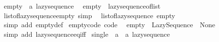 \begin{isabellebody}
\isanewline
%
\endisadelimproof
\isanewline
{}\isamarkupfalse%
\ empty\ {\isacharcolon}{\kern0pt}{\isacharcolon}{\kern0pt}\ {\isachardoublequoteopen}{\isacharprime}{\kern0pt}a\ lazy{\isacharunderscore}{\kern0pt}sequence{\isachardoublequoteclose}\isanewline
{}\isanewline
\ \ {\isachardoublequoteopen}empty\ {\isacharequal}{\kern0pt}\ lazy{\isacharunderscore}{\kern0pt}sequence{\isacharunderscore}{\kern0pt}of{\isacharunderscore}{\kern0pt}list\ {\isacharbrackleft}{\kern0pt}{\isacharbrackright}{\kern0pt}{\isachardoublequoteclose}\isanewline
\isanewline
{}\isamarkupfalse%
\ list{\isacharunderscore}{\kern0pt}of{\isacharunderscore}{\kern0pt}lazy{\isacharunderscore}{\kern0pt}sequence{\isacharunderscore}{\kern0pt}empty\ {\isacharbrackleft}{\kern0pt}simp{\isacharbrackright}{\kern0pt}{\isacharcolon}{\kern0pt}\isanewline
\ \ {\isachardoublequoteopen}list{\isacharunderscore}{\kern0pt}of{\isacharunderscore}{\kern0pt}lazy{\isacharunderscore}{\kern0pt}sequence\ empty\ {\isacharequal}{\kern0pt}\ {\isacharbrackleft}{\kern0pt}{\isacharbrackright}{\kern0pt}{\isachardoublequoteclose}\isanewline
%
\isadelimproof
\ \ %
\endisadelimproof
%
\isatagproof
{}\isamarkupfalse%
\ {\isacharparenleft}{\kern0pt}simp\ add{\isacharcolon}{\kern0pt}\ empty{\isacharunderscore}{\kern0pt}def{\isacharparenright}{\kern0pt}%
\endisatagproof
{\isafoldproof}%
%
\isadelimproof
\isanewline
%
\endisadelimproof
\isanewline
{}\isamarkupfalse%
\ empty{\isacharunderscore}{\kern0pt}code\ {\isacharbrackleft}{\kern0pt}code{\isacharbrackright}{\kern0pt}{\isacharcolon}{\kern0pt}\isanewline
\ \ {\isachardoublequoteopen}empty\ {\isacharequal}{\kern0pt}\ Lazy{\isacharunderscore}{\kern0pt}Sequence\ {\isacharparenleft}{\kern0pt}{\isasymlambda}{\isacharunderscore}{\kern0pt}{\isachardot}{\kern0pt}\ None{\isacharparenright}{\kern0pt}{\isachardoublequoteclose}\isanewline
%
\isadelimproof
\ \ %
\endisadelimproof
%
\isatagproof
{}\isamarkupfalse%
\ {\isacharparenleft}{\kern0pt}simp\ add{\isacharcolon}{\kern0pt}\ lazy{\isacharunderscore}{\kern0pt}sequence{\isacharunderscore}{\kern0pt}eq{\isacharunderscore}{\kern0pt}iff{\isacharparenright}{\kern0pt}%
\endisatagproof
{\isafoldproof}%
%
\isadelimproof
\isanewline
%
\endisadelimproof
\isanewline
{}\isamarkupfalse%
\ single\ {\isacharcolon}{\kern0pt}{\isacharcolon}{\kern0pt}\ {\isachardoublequoteopen}{\isacharprime}{\kern0pt}a\ {\isasymRightarrow}\ {\isacharprime}{\kern0pt}a\ lazy{\isacharunderscore}{\kern0pt}sequence{\isachardoublequoteclose}\isanewline
{}\isanewline

\end{isabellebody}
